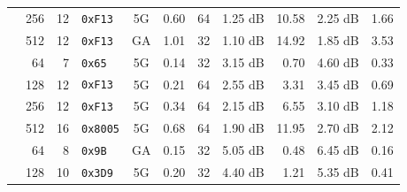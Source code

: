 \documentclass[11pt]{report}
\begin{document}
\begin{table}[h]
{{\begin{tabular}{c r r l c c r r r r r}
                                 & 256 & 12                                      & \texttt{0xF13 }             & 5G       & 0.60                                & 64                                  & 1.25 dB   & 10.58                             & 2.25 dB   & 1.66                              \\
                                 & 512 & 12                                      & \texttt{0xF13 }             & GA       & 1.01                                & 32                                  & 1.10 dB   & 14.92                             & 1.85 dB   & 3.53                              \\
          \addlinespace
          \multirow{4}{*}{$1/2$} & 64  & 7                                       & \texttt{0x65  }             & 5G       & 0.14                                & 32                                  & 3.15 dB   & 0.70                              & 4.60 dB   & 0.33                              \\
                                 & 128 & 12                                      & \texttt{0xF13 }             & 5G       & 0.21                                & 64                                  & 2.55 dB   & 3.31                              & 3.45 dB   & 0.69                              \\
                                 & 256 & 12                                      & \texttt{0xF13 }             & 5G       & 0.34                                & 64                                  & 2.15 dB   & 6.55                              & 3.10 dB   & 1.18                              \\
                                 & 512 & 16                                      & \texttt{0x8005}             & 5G       & 0.68                                & 64                                  & 1.90 dB   & 11.95                             & 2.70 dB   & 2.12                              \\
          \addlinespace
          \multirow{4}{*}{$4/5$} & 64  & 8                                       & \texttt{0x9B  }             & GA       & 0.15                                & 32                                  & 5.05 dB   & 0.48                              & 6.45 dB   & 0.16                              \\
                                 & 128 & 10                                      & \texttt{0x3D9 }             & 5G       & 0.20                                & 32                                  & 4.40 dB   & 1.21                              & 5.35 dB   & 0.41                              \\

\end{tabular}}}
\end{table}
\end{document}
